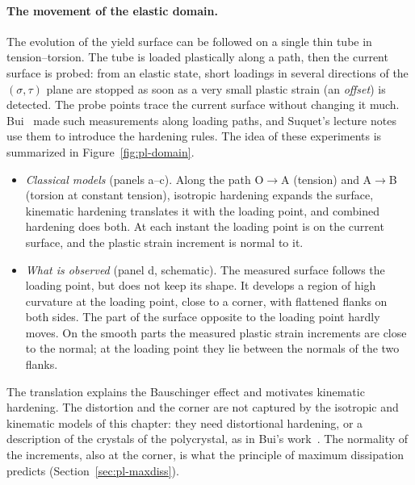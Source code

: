 \paragraph{The movement of the elastic domain.}
%
The evolution of the yield surface can be followed on a single thin tube in
tension--torsion. The tube is loaded plastically along a path, then the
current surface is probed: from an elastic state, short loadings in several
directions of the $(\sigma,\tau)$ plane are stopped as soon as a very small
plastic strain (an \emph{offset}) is detected. The probe points trace the
current surface without changing it much. Bui~\cite{Bui1970} made such
measurements along loading paths, and Suquet's lecture
notes~\cite{SuquetRP} use them to introduce the hardening rules. The
idea of these experiments is summarized in Figure~\ref{fig:pl-domain}.
\begin{itemize}
  \item \emph{Classical models} (panels a--c). Along the path O$\to$A
  (tension) and A$\to$B (torsion at constant tension), isotropic hardening
  expands the surface, kinematic hardening translates it with the loading
  point, and combined hardening does both. At each instant the loading point
  is on the current surface, and the plastic strain increment is normal to
  it.
  \item \emph{What is observed} (panel d, schematic). The measured surface
  follows the loading point, but does not keep its shape. It develops a
  region of high curvature at the loading point, close to a corner, with
  flattened flanks on both sides. The part of the surface opposite to the
  loading point hardly moves. On the smooth parts the measured plastic strain
  increments are close to the normal; at the loading point they lie between
  the normals of the two flanks.
\end{itemize}
The translation explains the Bauschinger effect and motivates kinematic
hardening. The distortion and the corner are not captured by the isotropic
and kinematic models of this chapter: they need distortional hardening, or
a description of the crystals of the polycrystal, as in Bui's
work~\cite{Bui1970}. The normality of the increments, also at the corner, is
what the principle of maximum dissipation predicts
(Section~\ref{sec:pl-maxdiss}).

